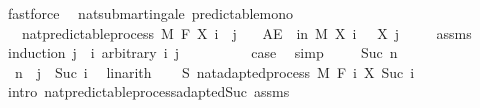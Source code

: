 \begin{isabellebody}
\ fastforce\isanewline
{}\isamarkupfalse%
%
\endisatagproof
{\isafoldproof}%
%
\isadelimproof
%
\endisadelimproof
%
\isadelimdocument
%
\endisadelimdocument
%
\isatagdocument
%
\isamarkuptrue%
%
\endisatagdocument
{\isafolddocument}%
%
\isadelimdocument
%
\endisadelimdocument
{}\isamarkupfalse%
\ {\isacharparenleft}{\kern0pt}\ nat{\isacharunderscore}{\kern0pt}submartingale{\isacharparenright}{\kern0pt}\ predictable{\isacharunderscore}{\kern0pt}mono{\isacharcolon}{\kern0pt}\isanewline
\ \ \ {\isachardoublequoteopen}nat{\isacharunderscore}{\kern0pt}predictable{\isacharunderscore}{\kern0pt}process\ M\ F\ X{\isachardoublequoteclose}\ {\isachardoublequoteopen}i\ {\isasymle}\ j{\isachardoublequoteclose}\isanewline
\ \ \ {\isachardoublequoteopen}AE\ {\isasymxi}\ in\ M{\isachardot}{\kern0pt}\ X\ i\ {\isasymxi}\ {\isasymle}\ X\ j\ {\isasymxi}{\isachardoublequoteclose}\isanewline
%
\isadelimproof
\ \ %
\endisadelimproof
%
\isatagproof
{}\isamarkupfalse%
\ assms{\isacharparenleft}{\kern0pt}{}{\isacharparenright}{\kern0pt}\isanewline
{}\isamarkupfalse%
\ {\isacharparenleft}{\kern0pt}induction\ {\isachardoublequoteopen}j\ {\isacharminus}{\kern0pt}\ i{\isachardoublequoteclose}\ arbitrary{\isacharcolon}{\kern0pt}\ i\ j{\isacharparenright}{\kern0pt}\isanewline
\ \ \isamarkupfalse%
\ {}\isanewline
\ \ \isamarkupfalse%
\ \isamarkupfalse%
\ {\isacharquery}{\kern0pt}case\ \isamarkupfalse%
\ simp\ \isanewline
{}\isamarkupfalse%
\isanewline
\ \ \isamarkupfalse%
\ {\isacharparenleft}{\kern0pt}Suc\ n{\isacharparenright}{\kern0pt}\isanewline
\ \ \isamarkupfalse%
\ {\isacharasterisk}{\kern0pt}{\isacharcolon}{\kern0pt}\ {\isachardoublequoteopen}n\ {\isacharequal}{\kern0pt}\ j\ {\isacharminus}{\kern0pt}\ Suc\ i{\isachardoublequoteclose}\ \isamarkupfalse%
\ linarith\isanewline
\ \ \isamarkupfalse%
\ S{\isacharcolon}{\kern0pt}\ nat{\isacharunderscore}{\kern0pt}adapted{\isacharunderscore}{\kern0pt}process\ M\ F\ {\isachardoublequoteopen}{\isasymlambda}i{\isachardot}{\kern0pt}\ X\ {\isacharparenleft}{\kern0pt}Suc\ i{\isacharparenright}{\kern0pt}{\isachardoublequoteclose}\ \isamarkupfalse%
\ {\isacharparenleft}{\kern0pt}intro\ nat{\isacharunderscore}{\kern0pt}predictable{\isacharunderscore}{\kern0pt}process{\isachardot}{\kern0pt}adapted{\isacharunderscore}{\kern0pt}Suc\ assms{\isacharparenright}{\kern0pt}\isanewline

\end{isabellebody}
